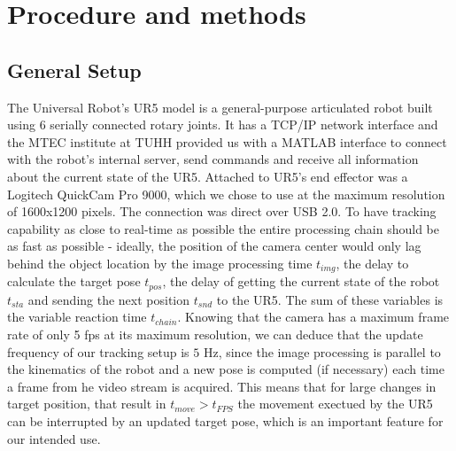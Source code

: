 \documentclass[letterpaper, 10 pt, conference]{ieeeconf}  %
\begin{document}

\section{Procedure and methods}

\subsection{General Setup}
The Universal Robot's UR5 model is a general-purpose articulated robot built using 6 serially connected rotary joints. It has a TCP/IP network interface and the MTEC institute at TUHH provided us with a MATLAB interface to connect with the robot's internal server, send commands and receive all information about the current state of the UR5. Attached to UR5's end effector was a Logitech QuickCam Pro 9000, which we chose to use at the maximum resolution of 1600x1200 pixels. The connection was direct over USB 2.0. 
To have tracking capability as close to real-time as possible the entire processing chain should be as fast as possible - ideally, the position of the camera center would only lag behind the object location by the image processing time $t_{img}$, the delay to calculate the target pose $t_{pos}$, the delay of getting the current state of the robot $t_{sta}$ and sending the next position $t_{snd}$ to the UR5. The sum of these variables is the variable reaction time $t_{chain}$. Knowing that the camera has a maximum frame rate of only 5 fps at its maximum resolution, we can deduce that the update frequency of our tracking setup is $5 $ Hz, since the image processing is parallel to the kinematics of the robot and a new pose is computed (if necessary) each time a frame from he video stream is acquired. This means that for large changes in target position, that result in $t_{move} > t_{FPS} $ the movement exectued by the UR5 can be interrupted by an updated target pose, which is an important feature for our intended use. %
\end{document}
